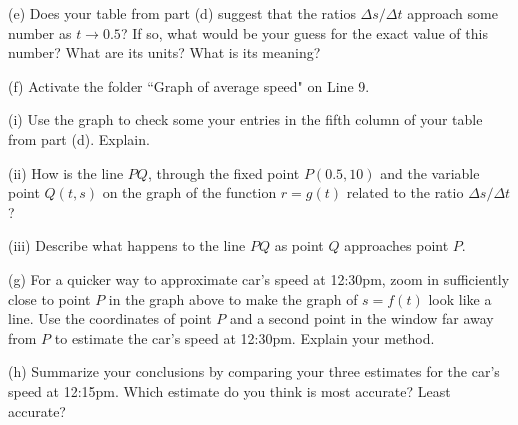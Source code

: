 \documentclass{ximera}
\begin{document}
\begin{example}
(e) Does  your table from part (d) suggest that the ratios $\Delta s/ \Delta t$ approach some number as $t\to 0.5$? If so, what would be your guess for the exact value of this number? What are its units? What is its meaning?

(f) Activate the folder ``Graph of average speed" on Line 9. 

(i) Use the graph to check some your entries in the fifth column of your table from part (d). Explain.

(ii) How is the line $PQ$, through the fixed point $P(0.5,10)$ and the variable point $Q(t,s)$ on the graph of the function $r=g(t)$ related to the ratio $\Delta s / \Delta t$?

(iii) Describe what happens to the line $PQ$ as point $Q$ approaches point $P$.

(g) For a quicker way to approximate car's speed at 12:30pm, zoom in sufficiently close to point $P$ in the graph above to make the graph of $s=f(t)$ look like a line. Use the coordinates of point $P$ and a second point in the window far away from $P$ to estimate the car's speed at 12:30pm. Explain your method.

(h) Summarize your conclusions by comparing your three estimates for the car's speed at 12:15pm. Which estimate do you think is most accurate? Least accurate?

\end{example}
\end{document}
